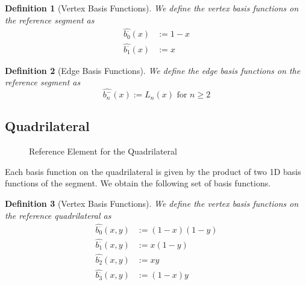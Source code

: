 \documentclass[10pt,a4paper]{article}
\newtheorem{defn}{Definition}
\begin{document}
    \begin{defn}[Vertex Basis Functions]
        We define the vertex basis functions on the reference segment as
        \begin{align*}
            \widehat{b_0^{\cdot}}(x) &:= 1 - x \\
            \widehat{b_1^{\cdot}}(x) &:= x
        \end{align*}
    \end{defn}

    \begin{defn}[Edge Basis Functions]
        We define the edge basis functions on the reference segment as
        \begin{equation*}
            \widehat{b_n^{-}}(x) := L_n(x) \mbox{ for } n \geq 2
        \end{equation*}
    \end{defn}


\subsection{Quadrilateral}

    \begin{figure}[ht!]
        \center
        \caption{Reference Element for the Quadrilateral}
        \label{fig:ref_quad}
    \end{figure}

    Each basis function on the quadrilateral is given by the product of two 1D basis functions of the segment. We obtain the following set of basis functions.
    
    \begin{defn}[Vertex Basis Functions]
        We define the vertex basis functions on the reference quadrilateral as
        \begin{align*}
            \widehat{b_0^{\cdot}}(x,y) &:= (1-x)(1-y) \\
            \widehat{b_1^{\cdot}}(x,y) &:= x(1-y) \\
            \widehat{b_2^{\cdot}}(x,y) &:= xy \\
            \widehat{b_3^{\cdot}}(x,y) &:= (1-x)y
        \end{align*}
    \end{defn}
\end{document}
